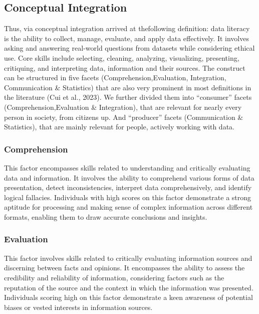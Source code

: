 \documentclass[
  12pt,
  a4paper,
  twoside]{article}
\begin{document}
\subsection{Conceptual Integration}\label{conceptual-integration}

Thus, via conceptual integration arrived at thefollowing definition: data literacy is the ability to collect, manage, evaluate, and apply data effectively. It involves asking and answering real-world questions from datasets while considering ethical use. Core skills include selecting, cleaning, analyzing, visualizing, presenting, critiquing, and interpreting data, information and their sources.
The construct can be structured in five facets (Comprehension,Evaluation, Integration, Communication \& Statistics) that are also very prominent in most definitions in the literature (Cui et al., 2023). We further divided them into ``consumer'' facets (Comprehension,Evaluation \& Integration), that are relevant for nearly every person in society, from citizens up. And ``producer'' facets (Communication \& Statistics), that are mainly relevant for people, actively working with data.

\subsubsection{Comprehension}\label{comprehension}

This factor encompasses skills related to understanding and critically evaluating data and information. It involves the ability to comprehend various forms of data presentation, detect inconsistencies, interpret data comprehensively, and identify logical fallacies. Individuals with high scores on this factor demonstrate a strong aptitude for processing and making sense of complex information across different formats, enabling them to draw accurate conclusions and insights.

\subsubsection{Evaluation}\label{evaluation}

This factor involves skills related to critically evaluating information sources and discerning between facts and opinions. It encompasses the ability to assess the credibility and reliability of information, considering factors such as the reputation of the source and the context in which the information was presented. Individuals scoring high on this factor demonstrate a keen awareness of potential biases or vested interests in information sources.
\end{document}
